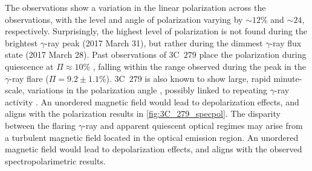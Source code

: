 The observations show a variation in the linear polarization across the observations, with the level and angle of polarization varying by $\sim 12\%$ and $\sim 24$\degree, respectively.  %
Surprisingly, the highest level of polarization is not found during the brightest $\gamma$-ray peak (2017 March 31), but rather during the dimmest $\gamma$-ray flux state (2017 March 28).
Past observations of 3C~$279$ place the polarization during quiescence at $\Pi \approx 10 \%$ \citep[see e.g.,][]{3C279_xray}, falling within the range observed during the peak in the $\gamma$-ray flare ($\Pi = 9.2 \pm 1.1\%$).
3C~$279$ is also known to show large, rapid minute-scale, variations in the polarization angle \citep{3C279_var}, possibly linked to repeating $\gamma$-ray activity \citep{3C279_repeat}.
An unordered magnetic field would lead to depolarization effects, and aligns with the polarization results in \autoref{fig:3C_279_specpol}.
The disparity between the flaring $\gamma$-ray and apparent quiescent optical regimes may arise from a turbulent magnetic field located in the optical emission region.
An unordered magnetic field would lead to depolarization effects, and aligns with the observed spectropolarimetric results.




